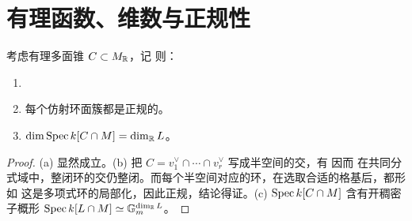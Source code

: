 \section{有理函数、维数与正规性}
\begin{proposition}\label{prop:4.6}
考虑有理多面锥 $C\subset M_{\mathbb R}$，记
则：
\begin{enumerate}[label=(\alph*)]
\item {}
\item 每个仿射环面簇都是正规的。
\item $\dim\operatorname{Spec} k[C\cap M]=\dim_{\mathbb R} L$。
\end{enumerate}
\end{proposition}
\begin{proof}
(a) 显然成立。(b) 把 $C=v_1^\vee\cap\cdots\cap v_r^\vee$ 写成半空间的交，有
因而
在共同分式域中，整闭环的交仍整闭。而每个半空间对应的环，在选取合适的格基后，都形如
这是多项式环的局部化，因此正规，结论得证。(c) $\operatorname{Spec} k[C\cap M]$ 含有开稠密子概形 $\operatorname{Spec} k[L\cap M]\simeq\mathbb G_m^{\dim_{\mathbb R} L}$。
\end{proof}
